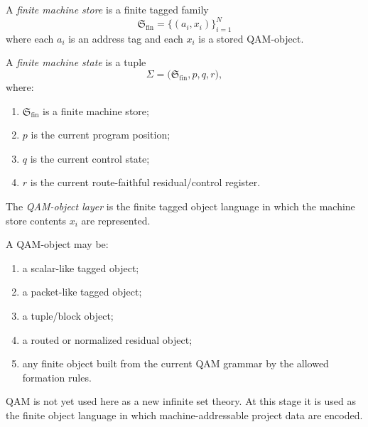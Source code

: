 \begin{definition}\label{def:finite-machine-store-computational-layer}
A \emph{finite machine store} is a finite tagged family
\[
\mathfrak{S}_{\mathrm{fin}}
=
\{(a_i,x_i)\}_{i=1}^{N}
\]
where each \(a_i\) is an address tag and each \(x_i\) is a stored QAM-object.
\end{definition}

\begin{definition}\label{def:finite-machine-state-computational-layer}
A \emph{finite machine state} is a tuple
\[
\Sigma
=
\bigl(
\mathfrak{S}_{\mathrm{fin}},
p,
q,
r
\bigr),
\]
where:
\begin{enumerate}[leftmargin=2em]
    \item \(\mathfrak{S}_{\mathrm{fin}}\) is a finite machine store;
    \item \(p\) is the current program position;
    \item \(q\) is the current control state;
    \item \(r\) is the current route-faithful residual/control register.
\end{enumerate}
\end{definition}

\begin{definition}\label{def:qam-object-layer-computational-layer}
The \emph{QAM-object layer} is the finite tagged object language in which the machine store contents \(x_i\) are represented.

A QAM-object may be:
\begin{enumerate}[leftmargin=2em]
    \item a scalar-like tagged object;
    \item a packet-like tagged object;
    \item a tuple/block object;
    \item a routed or normalized residual object;
    \item any finite object built from the current QAM grammar by the allowed formation rules.
\end{enumerate}
\end{definition}

\begin{remark}\label{rem:qam-as-object-language-computational-layer}
QAM is not yet used here as a new infinite set theory. At this stage it is used as the finite object language in which machine-addressable project data are encoded.
\end{remark}

